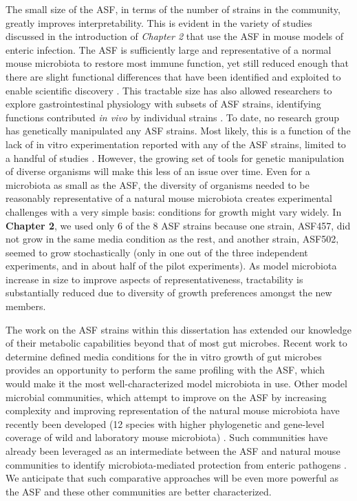 \documentclass[11pt,twocolumn,notitlepage,openany,twoside]{book}
\begin{document}
\begin{refsection}
The small size of the ASF, in terms of the number of strains in the community, greatly improves interpretability. This is evident in the variety of studies discussed in the introduction of \textit{Chapter 2} that use the ASF in mouse models of enteric infection. The ASF is sufficiently large and representative of a normal mouse microbiota to restore most immune function, yet still reduced enough that there are slight functional differences that have been identified and exploited to enable scientific discovery \cite{Ivanov2008-cl}. This tractable size has also allowed researchers to explore gastrointestinal physiology with subsets of ASF strains, identifying functions contributed \textit{in vivo} by individual strains \cite{Brugiroux2016-vi}. To date, no research group has genetically manipulated any ASF strains. Most likely, this is a function of the lack of in vitro experimentation reported with any of the ASF strains, limited to a handful of studies \cite{Biggs2017-fs,Loy2017-rb,Medlock2018-ub}. However, the growing set of tools for genetic manipulation of diverse organisms will make this less of an issue over time. Even for a microbiota as small as the ASF, the diversity of organisms needed to be reasonably representative of a natural mouse microbiota creates experimental challenges with a very simple basis: conditions for growth might vary widely. In \textbf{Chapter 2}, we used only 6 of the 8 ASF strains because one strain, ASF457, did not grow in the same media condition as the rest, and another strain, ASF502, seemed to grow stochastically (only in one out of the three independent experiments, and in about half of the pilot experiments). As model microbiota increase in size to improve aspects of representativeness, tractability is substantially reduced due to diversity of growth preferences amongst the new members.

The work on the ASF strains within this dissertation has extended our knowledge of their metabolic capabilities beyond that of most gut microbes. Recent work to determine defined media conditions for the in vitro growth of gut microbes provides an opportunity to perform the same profiling with the ASF, which would make it the most well-characterized model microbiota in use. Other model microbial communities, which attempt to improve on the ASF by increasing complexity and improving representation of the natural mouse microbiota have recently been developed (12 species with higher phylogenetic and gene-level coverage of wild and laboratory mouse microbiota) \cite{Garzetti2017-os}. Such communities have already been leveraged as an intermediate between the ASF and natural mouse communities to identify microbiota-mediated protection from enteric pathogens \cite{Brugiroux2016-vi}. We anticipate that such comparative approaches will be even more powerful as the ASF and these other communities are better characterized.


\end{refsection}
\end{document}
